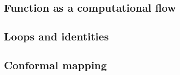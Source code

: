 \subsection{Function as a computational flow}

\subsection{Loops and identities}

\subsection{Conformal mapping}


